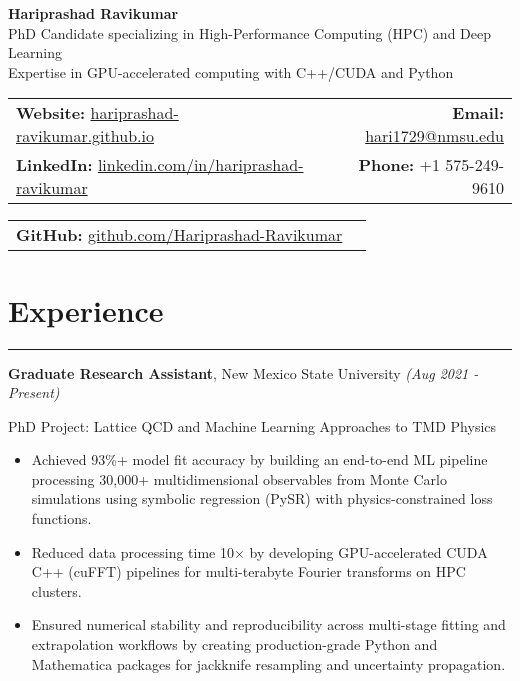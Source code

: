 \documentclass[11pt]{article}
\begin{document}
\begin{center}
  \textbf{\Huge Hariprashad Ravikumar} \\[0.6em]
  \vspace{0.5em}
  PhD Candidate specializing in High-Performance Computing (HPC) and Deep Learning \\
  Expertise in GPU-accelerated computing with C++/CUDA and Python \\
\end{center}

\begin{tabularx}{\textwidth}{@{}Xr@{}}
    \textbf{Website:} \href{https://hariprashad-ravikumar.github.io}{hariprashad-ravikumar.github.io} & \textbf{Email:} \href{mailto:hari1729@nmsu.edu}{hari1729@nmsu.edu}  \\
    \textbf{LinkedIn:} \href{https://www.linkedin.com/in/hariprashad-ravikumar}{linkedin.com/in/hariprashad-ravikumar} & \textbf{Phone:} +1 575-249-9610 
\end{tabularx}
\vspace{-1em}
\begin{tabularx}{\textwidth}{@{}Xr@{}}
\textbf{GitHub:} \href{https://github.com/Hariprashad-Ravikumar}{github.com/Hariprashad-Ravikumar}  \\
\end{tabularx}


\section*{Experience}
\hrule
\vspace{-0.3em}
\textbf{Graduate Research Assistant}, New Mexico State University \hfill \textit{(Aug 2021 - Present)}
\vspace{-0.2em}

PhD Project: Lattice QCD and Machine Learning Approaches to TMD Physics
\vspace{-0.5em}
\begin{itemize}
\item Achieved 93\%+ model fit accuracy by building an end-to-end ML pipeline processing 30,000+ multidimensional observables from Monte Carlo simulations using symbolic regression (PySR) with physics-constrained loss functions.
\vspace{-0.5em}
\item Reduced data processing time 10× by developing GPU-accelerated CUDA C++ (cuFFT) pipelines for multi-terabyte Fourier transforms on HPC clusters.
\vspace{-0.5em}
\item Ensured numerical stability and reproducibility across multi-stage fitting and extrapolation workflows by creating production-grade Python and Mathematica packages for jackknife resampling and uncertainty propagation.
\end{itemize}
\end{document}
